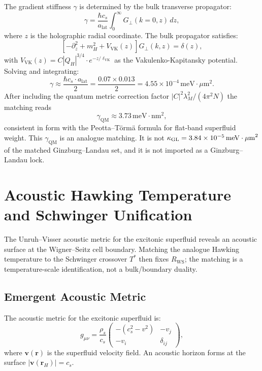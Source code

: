 \documentclass[11pt,letterpaper]{article}
\begin{document}
The \TQGL{} gradient stiffness $\gamma$ is determined by the bulk transverse propagator:
\begin{equation}
\gamma = \frac{\hbar c_s}{a_{\text{lat}}} \int_0^\infty G_\perp(k=0, z)\, dz,
\end{equation}
where $z$ is the holographic radial coordinate. The bulk propagator satisfies:
\begin{equation}
\left[-\partial_z^2 + m_H^2 + V_{\text{VK}}(z)\right] G_\perp(k, z) = \delta(z),
\end{equation}
with $V_{\text{VK}}(z) = C|Q_H|^{3/4} \cdot e^{-z/\ell_{\text{VK}}}$ as the Vakulenko-Kapitansky potential. Solving and integrating:
\begin{equation}
\gamma \approx \frac{\hbar c_s \cdot a_{\text{lat}}}{2} = \frac{0.07 \times 0.013}{2} = 4.55 \times 10^{-4}\,\text{meV}\cdot\mu\text{m}^2.
\end{equation}
After including the quantum metric correction factor $|C|^2 \lambda_M^2 / (4\pi^2 N)$ the matching reads
\begin{equation}
\gamma_{\text{QM}} \approx 3.73\,\text{meV}\cdot\text{nm}^2,
\end{equation}
consistent in form with the Peotta--T\"orm\"a formula for flat-band superfluid weight\cite{PeottaTorma2015,Huhtinen2022,Julku2020}. This $\gamma_{\mathrm{QM}}$ is an analogue matching. It is not $\kappa_{\mathrm{GL}}=3.84\times 10^{-5}\,\mathrm{meV\cdot\mu m}^{2}$ of the matched Ginzburg--Landau set, and it is not imported as a Ginzburg--Landau lock.

\section{Acoustic Hawking Temperature and Schwinger Unification}
\label{sec:acoustic_hawking}

The Unruh--Visser acoustic metric for the excitonic superfluid reveals an acoustic surface at the Wigner--Seitz cell boundary. Matching the analogue Hawking temperature to the Schwinger crossover $T^*$ then fixes $R_{\mathrm{WS}}$; the matching is a temperature-scale identification, not a bulk/boundary duality.

\subsection{Emergent Acoustic Metric}

The acoustic metric for the excitonic superfluid is:
\begin{equation}
g_{\mu\nu} = \frac{\rho_s}{c_s}\begin{pmatrix}
-(c_s^2 - v^2) & -v_j \\
-v_i & \delta_{ij}
\end{pmatrix},
\end{equation}
where $\mathbf{v}(\mathbf{r})$ is the superfluid velocity field. An acoustic horizon forms at the surface $|\mathbf{v}(\mathbf{r}_H)| = c_s$.
\end{document}
